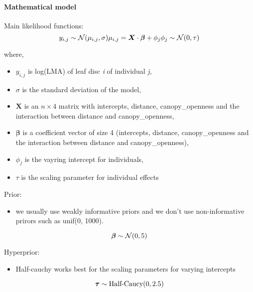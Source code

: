 \documentclass[
]{article}
\providecommand{\tightlist}{%
  \setlength{\itemsep}{0pt}\setlength{\parskip}{0pt}}
\begin{document}
\hypertarget{mathematical-model}{%
\paragraph*{Mathematical model}\label{mathematical-model}}

Main likelihood functions: \[
y_{i,j} \sim \mathcal{N}(\mu_{i,j}, \sigma)  \\
\mu_{i,j} = \boldsymbol{X} \cdot \boldsymbol{\beta} + \phi_j\\
\phi_j \sim \mathcal{N}(0, \tau)
\]

where,

\begin{itemize}
\item
  \(y_{i,j}\) is log(LMA) of leaf disc \emph{i} of individual \emph{j},
\item
  \(\sigma\) is the standard deviation of the model,
\item
  \(\boldsymbol{X}\) is an \(n \times 4\) matrix with intercepts,
  distance, canopy\_openness and the interaction between distance and
  canopy\_openness,
\item
  \(\boldsymbol{\beta}\) is a coefficient vector of size 4 (intercepts,
  distance, canopy\_openness and the interaction between distance and
  canopy\_openness),
\item
  \(\phi_j\) is the vayring intercept for individuals,
\item
  \(\tau\) is the scaling parameter for individual effects
\end{itemize}

Prior:

\begin{itemize}
\tightlist
\item
  we usually use weakly informative priors and we don't use
  non-informative prirors such as unif(0, 1000).
\end{itemize}

\[
\boldsymbol{\beta} \sim \mathcal{N}(0, 5) \\
\]

Hyperprior:

\begin{itemize}
\tightlist
\item
  Half-cauchy works best for the scaling parameters for varying
  intercepts
\end{itemize}

\[
\boldsymbol{\tau} \sim \text{Half-Caucy}(0, 2.5) \\
\]
\end{document}
